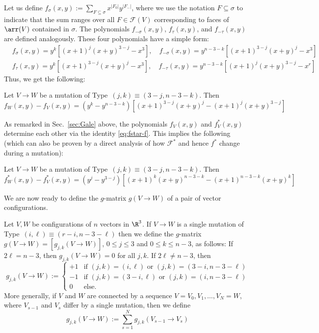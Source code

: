 Let us define $f_\sigma(x,y):=\sum_{F\subseteq \sigma}  x^{|F_0|}y^{|F_-|}$, 
where we use the notation $F\subseteq \sigma$ to indicate that the sum ranges over all $F \in \mathcal{F}(V)$ corresponding to faces of $\arr(V)$ contained in $\sigma$. The polynomials $f_{-\sigma}(x,y)$,  $f_\tau(x,y)$, and $f_{-\tau}(x,y)$ are defined analogously. 
These four polynomials have a simple form:
\begin{eqnarray*}
& f_\sigma (x,y)=y^k\left[(x+1)^{j}(x+y)^{3-j}-x^3\right],\quad f_{-\sigma}(x,y)=y^{n-3-k}\left[(x+1)^{3-j}(x+y)^{j}-x^3\right] & \\
& f_\tau(x,y)=y^k\left[(x+1)^{3-j}(x+y)^{j}-x^3\right],\quad f_{-\tau}(x,y)=y^{n-3-k}\left[(x+1)^{j}(x+y)^{3-j}-x^r\right]
\end{eqnarray*}
Thus, we get the following:
\begin{lemma}
\label{lem:f-mutation}
Let $V\to W$ be a mutation of Type~$(j,k)\equiv(3-j,n-3-k)$. Then
\begin{equation}
\label{eq:f-g-mutation}
f_W(x,y)-f_V(x,y) = \left(y^k - y^{n-3-k}\right)\left[(x+1)^{3-j}(x+y)^{j} - (x+1)^{j}(x+y)^{3-j}\right]
\end{equation}
\end{lemma}
As remarked in Sec.~\ref{sec:Gale} above, the polynomials $f_V(x,y)$ and $f^*_V(x,y)$ determine each other via the identity \eqref{eq:fstar-f}. This implies the following (which can also be proven by a direct analysis of how $\mathcal{F}^*$ and hence $f^*$ change during a mutation):
\begin{lemma}
\label{lem:fstar-mutation}
Let $V\to W$ be a mutation of Type~$(j,k)\equiv(3-j,n-3-k)$. Then
\begin{equation}
\label{eq:fstar-g-mutation}
f^*_W(x,y)-f^*_V(x,y) = \left(y^j - y^{3-j}\right)\left[(x+1)^{k}(x+y)^{n-3-k} - (x+1)^{n-3-k}(x+y)^{k}\right]
\end{equation}
\end{lemma}
%
We are now ready to define the $g$-matrix $g(V\rightarrow W)$ of a pair of vector configurations. 
\begin{definition}
\label{def:g-pair}
Let $V,W$ be configurations of $n$ vectors in $\R^3$. 
%
If $V\to W$ is a single mutation of Type~$(i,\ell)\equiv(r-i,n-3-\ell)$ then we define the $g$-matrix 
$g(V\rightarrow W)=[g_{j,k}(V\rightarrow W)]$, $0\leq j\leq 3$ and $0\leq k \leq n-3$, as follows: 
%
If 
$2\ell=n-3$, then $g_{j,k}(V\to W)=0$ for all $j,k$. If 
$2\ell\neq n-3$, then
\[
g_{j,k}(V\to W):= 
\begin{cases}
  +1 & \textrm{if } (j,k)=(i,\ell) \textrm{ or }(j,k)=(3-i,n-3-\ell)\\
  -1 & \textrm{if } (j,k)=(3-i,\ell) \textrm{ or }(j,k)=(i,n-3-\ell)\\
  0 & \textrm{else.}  
\end{cases}
\]
More generally, if $V$ and $W$ are connected by a sequence $V=V_0, V_1,\dots, V_N=W$, where $V_{s-1}$ and $V_s$ differ by a single mutation, then we define
\[
g_{j,k}(V\to W):= \sum_{s=1}^N g_{j,k}(V_{s-1}\to V_s)
\]
\end{definition}
